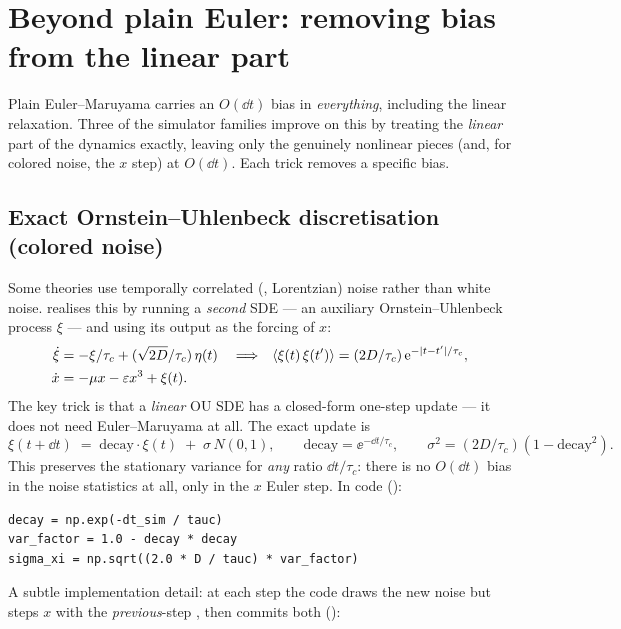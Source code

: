 \section{Beyond plain Euler: removing bias from the linear part}

Plain Euler--Maruyama carries an $O(\dd t)$ bias in \emph{everything}, including
the linear relaxation. Three of the simulator families improve on this by treating
the \emph{linear} part of the dynamics exactly, leaving only the genuinely
nonlinear pieces (and, for colored noise, the $x$ step) at $O(\dd t)$. Each trick
removes a specific bias.

\subsection{Exact Ornstein--Uhlenbeck discretisation (colored noise)}
\label{sec:colored}

Some theories use temporally correlated (, Lorentzian) noise rather
than white noise.  realises this by running
a \emph{second} SDE --- an auxiliary Ornstein--Uhlenbeck process $\xi$ --- and using
its output as the forcing of $x$:
\begin{align}
  \dot\xi &= -\xi/\tau_c + (\sqrt{2D}/\tau_c)\,\eta(t)
            &&\Longrightarrow&
            \left\langle \xi(t)\,\xi(t') \right\rangle &= (2D/\tau_c)\,\mathrm{e}^{-|t-t'|/\tau_c}, \\
  \dot x  &= -\mu x - \varepsilon x^{3} + \xi(t). &&&&
\end{align}
The key trick is that a \emph{linear} OU SDE has a closed-form one-step update ---
it does not need Euler--Maruyama at all. The exact update is
\begin{equation}
  \xi(t+\dd t) \;=\; \text{decay}\cdot\xi(t) \;+\; \sigma\,N(0,1),
  \qquad
  \text{decay} = \ee^{-\dd t/\tau_c},
  \qquad
  \sigma^{2} = (2D/\tau_c)(1 - \text{decay}^{2}).
  \label{eq:exactou}
\end{equation}
This preserves the stationary variance for \emph{any} ratio $\dd t/\tau_c$: there
is no $O(\dd t)$ bias in the noise statistics at all, only in the $x$ Euler step.
In code ():

\begin{lstlisting}
decay = np.exp(-dt_sim / tauc)
var_factor = 1.0 - decay * decay
sigma_xi = np.sqrt((2.0 * D / tauc) * var_factor)
\end{lstlisting}

A subtle implementation detail: at each step the code draws the new noise
 but steps $x$ with the \emph{previous}-step , then commits
both ():

